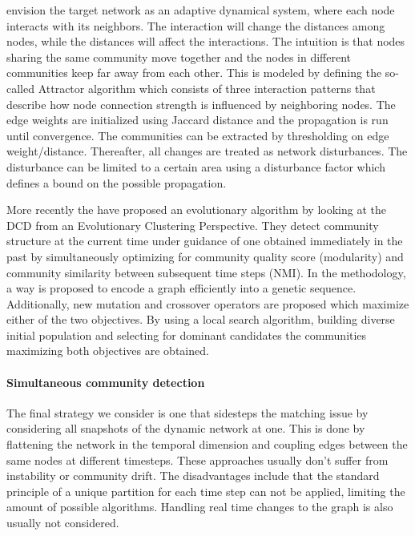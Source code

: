 \documentclass[
acmsmall,
nonacm,
screen,
acmthm]{../../scripts/pandoc/templates/acmart}
\begin{document}
\citet{guoDynamicCommunityDetection2016} envision the target network as
an adaptive dynamical system, where each node interacts with its
neighbors. The interaction will change the distances among nodes, while
the distances will affect the interactions. The intuition is that nodes
sharing the same community move together and the nodes in different
communities keep far away from each other. This is modeled by defining
the so-called Attractor algorithm which consists of three interaction
patterns that describe how node connection strength is influenced by
neighboring nodes. The edge weights are initialized using Jaccard
distance and the propagation is run until convergence. The communities
can be extracted by thresholding on edge weight/distance. Thereafter,
all changes are treated as network disturbances. The disturbance can be
limited to a certain area using a disturbance factor which defines a
bound on the possible propagation.

More recently the \citet{yinMultiobjectiveEvolutionaryClustering2021}
have proposed an evolutionary algorithm by looking at the DCD from an
Evolutionary Clustering Perspective. They detect community structure at
the current time under guidance of one obtained immediately in the past
by simultaneously optimizing for community quality score (modularity)
and community similarity between subsequent time steps (NMI). In the
methodology, a way is proposed to encode a graph efficiently into a
genetic sequence. Additionally, new mutation and crossover operators are
proposed which maximize either of the two objectives. By using a local
search algorithm, building diverse initial population and selecting for
dominant candidates the communities maximizing both objectives are
obtained.

\hypertarget{simultaneous-community-detection}{%
\paragraph{Simultaneous community
detection}\label{simultaneous-community-detection}}

The final strategy we consider is one that sidesteps the matching issue
by considering all snapshots of the dynamic network at one. This is done
by flattening the network in the temporal dimension and coupling edges
between the same nodes at different timesteps. These approaches usually
don't suffer from instability or community drift. The disadvantages
include that the standard principle of a unique partition for each time
step can not be applied, limiting the amount of possible algorithms.
Handling real time changes to the graph is also usually not considered.
\end{document}
